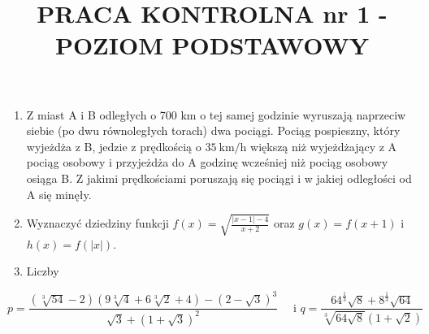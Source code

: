 \documentclass[10pt]{article}
\title{PRACA KONTROLNA nr 1 - POZIOM PODSTAWOWY }
\author{}
\date{}
\begin{document}
\maketitle
\begin{enumerate}
  \item Z miast A i B odległych o 700 km o tej samej godzinie wyruszają naprzeciw siebie (po dwu równoległych torach) dwa pociągi. Pociąg pospieszny, który wyjeżdża z B, jedzie z prędkością o $35 \mathrm{~km} / \mathrm{h}$ większą niż wyjeżdżający z A pociąg osobowy i przyjeżdża do A godzinę wcześniej niż pociąg osobowy osiąga B. Z jakimi prędkościami poruszają się pociągi i w jakiej odległości od A się minęły.
  \item Wyznaczyć dziedziny funkcji $f(x)=\sqrt{\frac{|x-1|-4}{x+2}}$ oraz $g(x)=f(x+1)$ i $h(x)=f(|x|)$.
  \item Liczby
\end{enumerate}

$$
p=\frac{(\sqrt[3]{54}-2)(9 \sqrt[3]{4}+6 \sqrt[3]{2}+4)-(2-\sqrt{3})^{3}}{\sqrt{3}+(1+\sqrt{3})^{2}} \quad \text { i } q=\frac{64^{\frac{1}{3}} \sqrt{8}+8^{\frac{1}{3}} \sqrt{64}}{\sqrt[3]{64 \sqrt{8}}(1+\sqrt{2})}
$$
\end{document}
